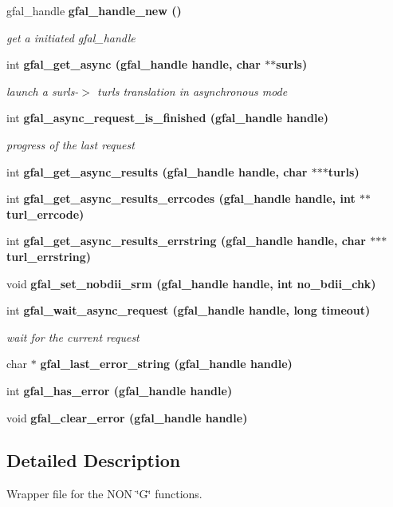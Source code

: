 \begin{CompactItemize}
\item 
gfal\_\-handle \bf{gfal\_\-handle\_\-new} ()
\begin{CompactList}\small\item\em get a initiated gfal\_\-handle \item\end{CompactList}\item 
int \bf{gfal\_\-get\_\-async} (gfal\_\-handle handle, char $\ast$$\ast$surls)
\begin{CompactList}\small\item\em launch a surls-$>$ turls translation in asynchronous mode \item\end{CompactList}\item 
int \bf{gfal\_\-async\_\-request\_\-is\_\-finished} (gfal\_\-handle handle)
\begin{CompactList}\small\item\em progress of the last request \item\end{CompactList}\item 
int \bf{gfal\_\-get\_\-async\_\-results} (gfal\_\-handle handle, char $\ast$$\ast$$\ast$turls)
\item 
int \bf{gfal\_\-get\_\-async\_\-results\_\-errcodes} (gfal\_\-handle handle, int $\ast$$\ast$turl\_\-errcode)
\item 
int \bf{gfal\_\-get\_\-async\_\-results\_\-errstring} (gfal\_\-handle handle, char $\ast$$\ast$$\ast$turl\_\-errstring)
\item 
void \bf{gfal\_\-set\_\-nobdii\_\-srm} (gfal\_\-handle handle, int no\_\-bdii\_\-chk)
\item 
int \bf{gfal\_\-wait\_\-async\_\-request} (gfal\_\-handle handle, long timeout)
\begin{CompactList}\small\item\em wait for the current request \item\end{CompactList}\item 
char $\ast$ \bf{gfal\_\-last\_\-error\_\-string} (gfal\_\-handle handle)
\item 
int \bf{gfal\_\-has\_\-error} (gfal\_\-handle handle)
\item 
void \bf{gfal\_\-clear\_\-error} (gfal\_\-handle handle)
\end{CompactItemize}


\subsection{Detailed Description}
Wrapper file for the NON \char`\"{}G\char`\"{} functions. 

